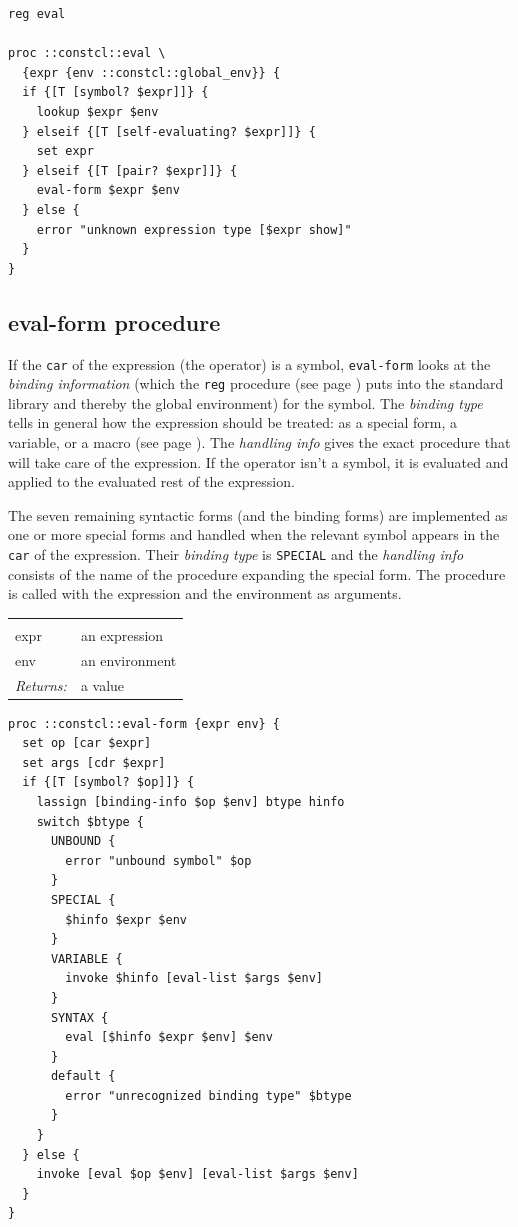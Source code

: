 \documentclass[twoside]{report}
\begin{document}
\begin{lstlisting}
reg eval

proc ::constcl::eval \
  {expr {env ::constcl::global_env}} {
  if {[T [symbol? $expr]]} {
    lookup $expr $env
  } elseif {[T [self-evaluating? $expr]]} {
    set expr
  } elseif {[T [pair? $expr]]} {
    eval-form $expr $env
  } else {
    error "unknown expression type [$expr show]"
  }
}
\end{lstlisting}

\subsection{eval-form procedure}
\label{evalform-procedure}

If the \texttt{car} of the expression (the operator) is a symbol, \texttt{eval-form} looks at the \emph{binding information} (which the \texttt{reg} procedure (see page \pageref{reg-procedure}) puts into the standard library and thereby the global environment) for the symbol. The \emph{binding type} tells in general how the expression should be treated: as a special form, a variable, or a macro (see page \pageref{macros}). The \emph{handling info} gives the exact procedure that will take care of the expression. If the operator isn't a symbol, it is evaluated and applied to the evaluated rest of the expression.

The seven remaining syntactic forms (and the binding forms) are implemented as one or more special forms and handled when the relevant symbol appears in the \texttt{car} of the expression. Their \emph{binding type} is \texttt{SPECIAL} and the \emph{handling info} consists of the name of the procedure expanding the special form. The procedure is called with the expression and the environment as arguments.

\noindent\begin{tabular}{ |p{1.9cm} p{8cm}| }
\hline
\rowcolor[HTML]{CCCCCC} \multicolumn{2}{|l|}{\bf eval-form (internal)} \\
expr & an expression \\
env & an environment \\
\textit{Returns:} & a value \\
\hline
\end{tabular}

\begin{lstlisting}
proc ::constcl::eval-form {expr env} {
  set op [car $expr]
  set args [cdr $expr]
  if {[T [symbol? $op]]} {
    lassign [binding-info $op $env] btype hinfo
    switch $btype {
      UNBOUND {
        error "unbound symbol" $op
      }
      SPECIAL {
        $hinfo $expr $env
      }
      VARIABLE {
        invoke $hinfo [eval-list $args $env]
      }
      SYNTAX {
        eval [$hinfo $expr $env] $env
      }
      default {
        error "unrecognized binding type" $btype
      }
    }
  } else {
    invoke [eval $op $env] [eval-list $args $env]
  }
}
\end{lstlisting}
\end{document}
